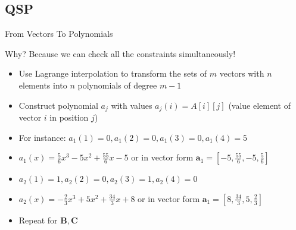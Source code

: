 \documentclass[handout]{beamer}
\begin{document}
\subsection{QSP}
\begin{frame}{From Vectors To Polynomials}
    \begin{block}{Why?}
        Because we can check all the constraints simultaneously!
    \end{block}
    \begin{itemize}
        \item Use Lagrange interpolation to transform the sets of $m$ vectors with $n$ elements into $n$ polynomials of degree $m-1$
        \item Construct polynomial $a_j$ with values $a_j(i) =A[i][j]$ (value element of vector $i$ in position $j$)
        \item For instance: $a_1(1) = 0, a_1(2) = 0, a_1(3)=0, a_1(4) = 5$
        \item $a_1(x) = \frac{5}{6}x^3-5x^2+\frac{55}{6}x-5$ or in vector form $\bm{a}_1 = [-5,\frac{55}{6},-5,\frac{5}{6}]$
        \item $a_2(1) = 1, a_2(2) = 0, a_2(3)=1, a_2(4) = 0$
        \item $a_2(x) = -\frac{2}{3}x^3+5x^2+\frac{34}{3}x+8$ or in vector form $\bm{a}_1 = [8,\frac{34}{3},5,\frac{2}{3}]$
        \item Repeat for $\bm{B}, \bm{C}$
    \end{itemize}
\end{frame}
 
\end{document}
